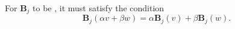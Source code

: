 For \(\mathbf{B}_j\) to be , it must satisfy the condition
\begin{equation}
	\mathbf{B}_j(\alpha v + \beta w) = \alpha \mathbf{B}_j (v) + \beta \mathbf{B}_j(w).
\end{equation}